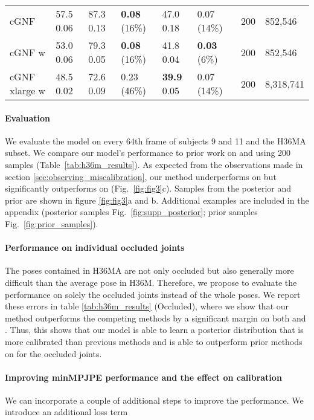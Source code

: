\documentclass{article} \usepackage{iclr2023_conference,times}
\begin{document}
\begin{table}[h!]
\begin{tabular}{l|lll|ll|ll}
\midrule
cGNF                    & 57.5 \tiny{ 0.06} & 87.3 \tiny{ 0.13} & \textbf{0.08} \tiny{(16\%)}  & 47.0 \tiny{ 0.18} & 0.07 \tiny{(14\%)}  & 200 & 852,546   \\
cGNF w  & 53.0 \tiny{ 0.06} & 79.3 \tiny{ 0.05} & \textbf{0.08} \tiny{(16\%)}  & 41.8 \tiny{ 0.04} & \textbf{0.03} \tiny{(6\%)}  \ \  & 200 & 852,546 \\
cGNF xlarge w                                   & 48.5  \tiny{ 0.02}                     & 72.6 \tiny{ 0.09}                      & 0.23 \tiny{(46\%)}                        & \textbf{39.9} \tiny{ 0.05}                                & 0.07 \tiny{(14\%)}                      & 200                      & 8,318,741 \\
\bottomrule
\end{tabular}
\end{table}

\paragraph{Evaluation}
We evaluate the model on every 64th frame of subjects 9 and 11 and the H36MA subset.
We compare our model's performance to prior work on  and  using 200 samples (Table~\ref{tab:h36m_results}).
As expected from the observations made in section \ref{sec:observing_miscalibration}, our method underperforms on  but significantly outperforms on  (Fig.~\ref{fig:fig3}c).
Samples from the posterior and prior are shown in figure \ref{fig:fig3}a and b.
Additional examples are included in the appendix (posterior samples Fig.~\ref{fig:supp_posterior}; prior samples Fig.~\ref{fig:prior_samples}).

\paragraph{Performance on individual occluded joints}
The poses contained in H36MA are not only occluded but also generally more difficult than the average pose in H36M.
Therefore, we propose to evaluate the performance on solely the occluded joints instead of the whole poses.
We report these errors in table \ref{tab:h36m_results} (Occluded), where we show that our method outperforms the competing methods by a significant margin on both  and .
Thus, this shows that our model is able to learn a posterior distribution that is more calibrated than previous methods and is able to outperform prior methods on  for the occluded joints.

\paragraph{Improving minMPJPE performance and the effect on calibration}
We can incorporate a couple of additional steps to improve the  performance.
We introduce an additional loss term 
 
\end{document}

